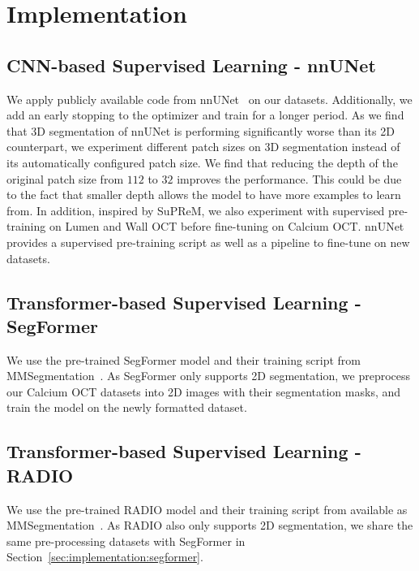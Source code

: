\documentclass[a4paper,11pt,oneside]{report}
\begin{document}
\chapter{Implementation}


\section{CNN-based Supervised Learning - nnUNet}
We apply publicly available code from nnUNet~\cite{Isensee2020} on our datasets. Additionally, we add an early stopping to the optimizer and train for a longer period. As we find that 3D segmentation of nnUNet is performing significantly worse than its 2D counterpart, we experiment different patch sizes on 3D segmentation instead of its automatically configured patch size. We find that reducing the depth of the original patch size from $112$ to $32$ improves the performance. This could be due to the fact that smaller depth allows the model to have more examples to learn from. In addition, inspired by SuPReM, we also experiment with supervised pre-training on Lumen and Wall OCT before fine-tuning on Calcium OCT. nnUNet provides a supervised pre-training script as well as a pipeline to fine-tune on new datasets.

\section{Transformer-based Supervised Learning - SegFormer}
We use the pre-trained SegFormer model and their training script from MMSegmentation~\cite{mmseg2020}. As SegFormer only supports 2D segmentation, we preprocess our Calcium OCT datasets into 2D images with their segmentation masks, and train the model on the newly formatted dataset.

\section{Transformer-based Supervised Learning - RADIO}
We use the pre-trained RADIO model and their training script from available as MMSegmentation~\cite{mmseg2020}. As RADIO also only supports 2D segmentation, we share the same pre-processing datasets with SegFormer in Section~\ref{sec:implementation:segformer}.
\end{document}
